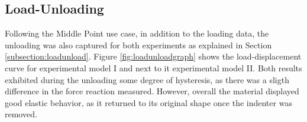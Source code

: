 \subsection{Load-Unloading}
\label{subsection:loadunloadresult}
Following the Middle Point use case, in addition to the loading data, the unloading was 
also captured for both experiments as explained in Section \ref{subsection:loadunload}.
Figure \ref{fig:loadunloadgraph} shows the load-displacement curve for experimental model 
I and next to it experimental model II. Both results exhibited during the unloading some 
degree of hysteresis, as there was a sligth difference in the force reaction measured.
However, overall the material displayed good elastic behavior, as it returned to its 
original shape once the indenter was removed.\\

